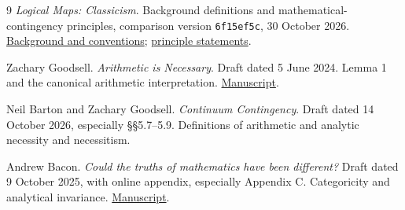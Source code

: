 \documentclass[11pt,letterpaper,numbers=noenddot]{scrartcl}
\numberwithin{equation}{section}
\theoremstyle{definition}
\begin{document}
\begin{thebibliography}{9}
\small
{}
\emph{Logical Maps: Classicism}. Background definitions and mathematical-contingency principles, comparison version \texttt{6f15ef5c}, 30 October 2026.
\href{https://github.com/zwlgzwlg/Logical-Maps/blob/6f15ef5c491fcb117d4d11d8837545a9baaa042d/logical-maps/topics/classicism/background.md}{Background and conventions};
\href{https://github.com/zwlgzwlg/Logical-Maps/tree/6f15ef5c491fcb117d4d11d8837545a9baaa042d/logical-maps/topics/classicism/principles}{principle statements}.

Zachary Goodsell. \emph{Arithmetic is Necessary}. Draft dated 5 June 2024. Lemma 1 and the canonical arithmetic interpretation.
\href{https://philarchive.org/archive/GOOAIN}{Manuscript}.

Neil Barton and Zachary Goodsell. \emph{Continuum Contingency}. Draft dated 14 October 2026, especially \S\S5.7--5.9. Definitions of arithmetic and analytic necessity and necessitism.

Andrew Bacon. \emph{Could the truths of mathematics have been different?} Draft dated 9 October 2025, with online appendix, especially Appendix C. Categoricity and analytical invariance.
\href{https://andrew-bacon.github.io/papers/Could\%20mathematics\%20have\%20been\%20different.pdf}{Manuscript}.
\end{thebibliography}
\end{document}
